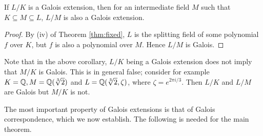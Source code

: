 \begin{corollary} \label{thm:galois-intermediate}
	If $L/K$ is a Galois extension, then for an intermediate field $M$ such that $K \subseteq M \subseteq L$, $L/M$ is also a Galois extension. 
\end{corollary}
\begin{proof}
	By (iv) of Theorem \ref{thm:fixed}, $L$ is the splitting field of some polynomial $f$ over $K$, but $f$ is also a polynomial over $M$. Hence $L/M$ is Galois.
\end{proof}

\begin{example}
	Note that in the above corollary, $L/K$ being a Galois extension does not imply that $M/K$ is Galois. This is in general false; consider for example $K = \mathbb Q, M = \mathbb Q(\sqrt[3]{2})$ and $L = \mathbb Q(\sqrt[3]{2}, \zeta)$, where $\zeta = e^{2\pi i / 3}$. Then $L/K$ and $L/M$ are Galois but $M/K$ is not. 
\end{example}

The most important property of Galois extensions is that of Galois correspondence, which we now establish. The following is needed for the main theorem. 


%





%
%
%

